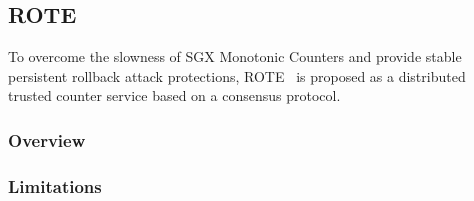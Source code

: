 \subsection{ROTE}

To overcome the slowness of SGX Monotonic Counters and provide stable persistent rollback attack protections, ROTE~\cite{} is proposed as a distributed trusted counter service based on a consensus protocol.

\subsubsection{Overview}



\subsubsection{Limitations}
